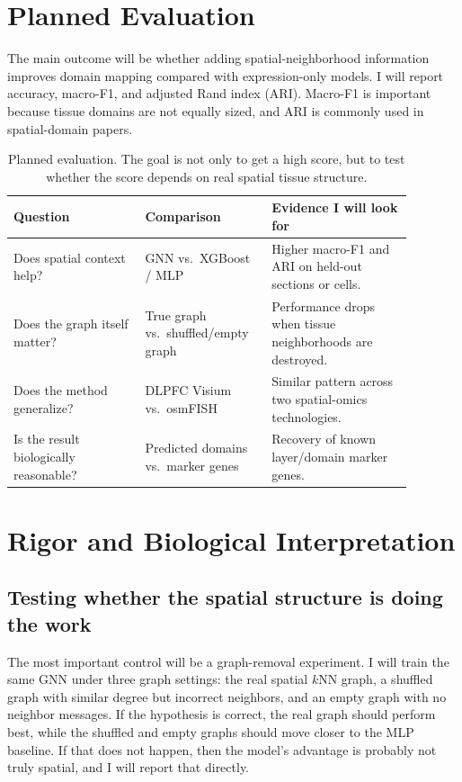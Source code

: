 \documentclass[11pt]{article}
\begin{document}
\section{Planned Evaluation}

The main outcome will be whether adding spatial-neighborhood information improves
domain mapping compared with expression-only models. I will report accuracy,
macro-F1, and adjusted Rand index (ARI). Macro-F1 is important because tissue
domains are not equally sized, and ARI is commonly used in spatial-domain papers.

\begin{table}[H]
\centering\small
\begin{tabular}{>{\raggedright\arraybackslash}p{0.30\linewidth} >{\raggedright\arraybackslash}p{0.26\linewidth} >{\raggedright\arraybackslash}p{0.32\linewidth}}
\toprule
\rowcolor{sriblue}\color{white}\textbf{Question} & \color{white}\textbf{Comparison} & \color{white}\textbf{Evidence I will look for}\\
\midrule
\rowcolor{srirow} Does spatial context help? & GNN vs.\ XGBoost / MLP & Higher macro-F1 and ARI on held-out sections or cells.\\
Does the graph itself matter? & True graph vs.\ shuffled/empty graph & Performance drops when tissue neighborhoods are destroyed.\\
\rowcolor{srirow} Does the method generalize? & DLPFC Visium vs.\ osmFISH & Similar pattern across two spatial-omics technologies.\\
Is the result biologically reasonable? & Predicted domains vs.\ marker genes & Recovery of known layer/domain marker genes.\\
\bottomrule
\end{tabular}
\caption{Planned evaluation. The goal is not only to get a high score, but to
test whether the score depends on real spatial tissue structure.}
\label{tab:evaluation}
\end{table}

\section{Rigor and Biological Interpretation}

\subsection{Testing whether the spatial structure is doing the work}
The most important control will be a graph-removal experiment. I will train the
same GNN under three graph settings: the real spatial $k$NN graph, a shuffled
graph with similar degree but incorrect neighbors, and an empty graph with no
neighbor messages. If the hypothesis is correct, the real graph should perform
best, while the shuffled and empty graphs should move closer to the MLP baseline.
If that does not happen, then the model's advantage is probably not truly
spatial, and I will report that directly.
\end{document}
